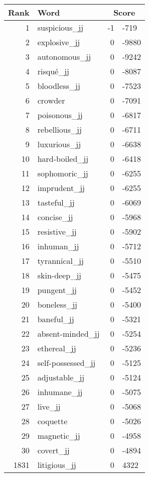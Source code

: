 \begin{longtable}[!htbp]{| rlr@{.}l |}
    \hline
    \textbf{Rank} & \textbf{Word} & \multicolumn{2}{c|}{\textbf{Score}} \\
    \hline
    \endhead
    1 & suspicious\_jj & -1 & -719 \\
    2 & explosive\_jj & 0 & -9880 \\
    3 & autonomous\_jj & 0 & -9242 \\
    4 & risqué\_jj & 0 & -8087 \\
    5 & bloodless\_jj & 0 & -7523 \\
    6 & crowder & 0 & -7091 \\
    7 & poisonous\_jj & 0 & -6817 \\
    8 & rebellious\_jj & 0 & -6711 \\
    9 & luxurious\_jj & 0 & -6638 \\
    10 & hard-boiled\_jj & 0 & -6418 \\
    11 & sophomoric\_jj & 0 & -6255 \\
    12 & imprudent\_jj & 0 & -6255 \\
    13 & tasteful\_jj & 0 & -6069 \\
    14 & concise\_jj & 0 & -5968 \\
    15 & resistive\_jj & 0 & -5902 \\
    16 & inhuman\_jj & 0 & -5712 \\
    17 & tyrannical\_jj & 0 & -5510 \\
    18 & skin-deep\_jj & 0 & -5475 \\
    19 & pungent\_jj & 0 & -5452 \\
    20 & boneless\_jj & 0 & -5400 \\
    21 & baneful\_jj & 0 & -5321 \\
    22 & absent-minded\_jj & 0 & -5254 \\
    23 & ethereal\_jj & 0 & -5236 \\
    24 & self-possessed\_jj & 0 & -5125 \\
    25 & adjustable\_jj & 0 & -5124 \\
    26 & inhumane\_jj & 0 & -5075 \\
    27 & live\_jj & 0 & -5068 \\
    28 & coquette & 0 & -5026 \\
    29 & magnetic\_jj & 0 & -4958 \\
    30 & covert\_jj & 0 & -4894 \\
    1831 & litigious\_jj & 0 & 4322 \\

\end{longtable}
